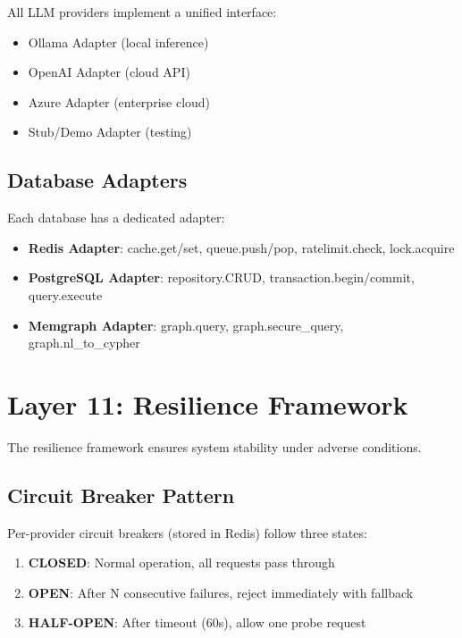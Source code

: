 \documentclass[a4paper,twoside]{sapthesis}
\begin{document}
All LLM providers implement a unified interface:

\begin{itemize}
    \item Ollama Adapter (local inference)
    \item OpenAI Adapter (cloud API)
    \item Azure Adapter (enterprise cloud)
    \item Stub/Demo Adapter (testing)
\end{itemize}

\subsection{Database Adapters}
\label{subsec:db-adapters}

Each database has a dedicated adapter:

\begin{itemize}
    \item \textbf{Redis Adapter}: cache.get/set, queue.push/pop, ratelimit.check, lock.acquire
    \item \textbf{PostgreSQL Adapter}: repository.CRUD, transaction.begin/commit, query.execute
    \item \textbf{Memgraph Adapter}: graph.query, graph.secure\_query, graph.nl\_to\_cypher
\end{itemize}

\section{Layer 11: Resilience Framework}
\label{sec:layer11-resilience}

The resilience framework ensures system stability under adverse conditions.

\subsection{Circuit Breaker Pattern}
\label{subsec:circuit-breaker}

Per-provider circuit breakers (stored in Redis) follow three states:

\begin{enumerate}
    \item \textbf{CLOSED}: Normal operation, all requests pass through
    \item \textbf{OPEN}: After N consecutive failures, reject immediately with fallback
    \item \textbf{HALF-OPEN}: After timeout (60s), allow one probe request
\end{enumerate}
\end{document}
